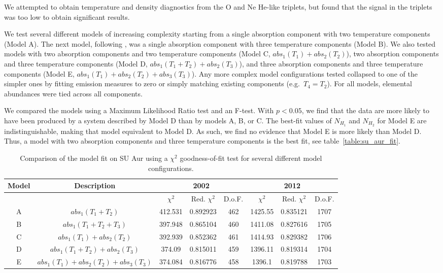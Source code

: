 \documentclass[twocolumn]{aastex631}
\begin{document}
We attempted to obtain temperature and density diagnostics from the O and Ne He-like triplets, but found that the signal in the triplets was too low to obtain significant results.

We test several different models of increasing complexity starting from a single absorption component with two temperature components (Model A). The next model, following \citet{robrade_xmm-newton_2006}, was a single absorption component with three temperature components (Model B). We also tested models with two absorption components and two temperature components (Model C, $abs_1(T_1) + abs_2(T_2)$), two absorption components and three temperature components (Model D, $abs_1(T_1+T_2) + abs_2(T_3)$), and three absorption components and three temperature components (Model E, $abs_1(T_1) + abs_2(T_2) + abs_3(T_3)$). Any more complex model configurations tested collapsed to one of the simpler ones by fitting emission measures to zero or simply matching existing components (e.g.\ $T_4 = T_2$). For all models, elemental abundances were tied across all components. 

We compared the models using a Maximum Likelihood Ratio test and an F-test. With $p < 0.05$, we find that the data are more likely to have been produced by a system described by Model D than by models A, B, or C. The best-fit values of $N_{H_1}$ and $N_{H_2}$ for Model E are indistinguishable, making that model equivalent to Model D. As such, we find no evidence that Model E is more likely than Model D. Thus, a model with two absorption components and three temperature components is the best fit, see table~\ref{table:su_aur_fit}.

\begin{table}
    \centering
    \begin{tabular}{|c|c|c|c|c|c|c|c|}
    \hline
    Model & Description & \multicolumn{3}{c|}{2002} & \multicolumn{3}{c|}{2012} \\
    \hline
    & & $\chi^2$ &  Red. $\chi^2$ & D.o.F. & $\chi^2$ & Red. $\chi^2 $& D.o.F.\\
    \hline
    A & $abs_1(T_1 + T_2)$            & 412.531 & 0.892923 & 462 & 1425.55 & 0.835121 & 1707 \\
    B & $abs_1(T_1 + T_2 + T_3)$      & 397.948 & 0.865104 & 460 & 1411.08 & 0.827616 & 1705 \\
    C & $abs_1(T_1) + abs_2(T_2)$     & 392.939 & 0.852362 & 461 & 1414.93 & 0.829382 & 1706 \\
    D & $abs_1(T_1+T_2) + abs_2(T_3)$ & 374.09  & 0.815011 & 459 & 1396.11 & 0.819314 & 1704 \\
    E & $abs_1(T_1) + abs_2(T_2) + abs_3(T_3)$ & 374.084 & 0.816776 & 458 & 1396.1 & 0.819788 & 1703 \\
    \hline
    \end{tabular}
    \caption{Comparison of the model fit on SU Aur using a $\chi^2$ goodness-of-fit test for several different model configurations.}
\end{table}
\end{document}

